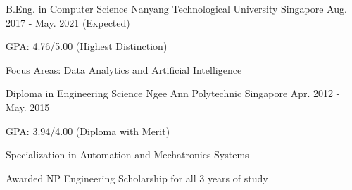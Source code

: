 

\begin{cventries}

  \cventry
    {B.Eng. in Computer Science} %
    {Nanyang Technological University} %
    {Singapore} %
    {Aug. 2017 - May. 2021 (Expected)} %
    {
      \begin{cvitems} %
        \item {GPA: 4.76/5.00 (Highest Distinction)}
        \item {Focus Areas: Data Analytics and Artificial Intelligence}
      \end{cvitems}
    }

  \cventry
	{Diploma in Engineering Science} %
	{Ngee Ann Polytechnic} %
	{Singapore} %
	{Apr. 2012 - May. 2015} %
	{
		\begin{cvitems} %
			\item {GPA: 3.94/4.00 (Diploma with Merit)}
			\item {Specialization in Automation and Mechatronics Systems}
			\item {Awarded NP Engineering Scholarship for all 3 years of study}
		\end{cvitems}
	}

\end{cventries}
